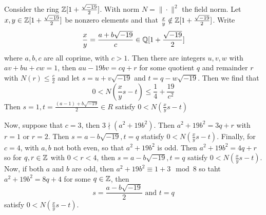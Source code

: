 \begin{example}\label{2.5}
    Consider the ring $\mathbb{Z}[1+\frac{\sqrt{-19}}{2}]$. With norm  $N=\|\cdot\|^2$
    the field norm. Let $x,y \in \mathbb{Z}[1+\frac{\sqrt{-19}}{2}]$ be nonzero elements
    and that $\frac{x}{y} \notin \mathbb{Z}[1+\frac{\sqrt{-19}}{2}]$. Write
    \begin{equation*}
        \frac{x}{y}=\frac{a+b\sqrt{-19}}{c} \in \mathbb{Q}[1+\frac{\sqrt{-19}}{2}]
    \end{equation*}
    where $a,b,c$ are all coprime, with  $c>1$. Then there are integers $u,v,w$
    with $av+bu+cw=1$, then  $au-19bv=cq+r$ for some quotient $q$ and remainder
    $r$ with  $N(r) \leq \frac{c}{2}$ and let $s=u+v\sqrt{-19}$ and
    $t=q-w\sqrt{-19}$. Then we find that
    \begin{equation*}
        0<N(\frac{x}{y}s-t) \leq \frac{1}{4}+\frac{19}{c^2}
    \end{equation*}
    Then $s=1, t=\frac{(a-1)+b\sqrt{-19}}{2} \in R$ satisfy $0<N(\frac{x}{y}s-t)$

    Now, suppose that $c=3$, then $3 \nmid (a^2+19b^2)$. Then $a^2+19b^2=3q+r$
    with  $r=1$ or $r=2$. Then $s=a-b\sqrt{-19},t=q$ statisfy
    $0<N(\frac{x}{y}s-t)$. Finally, for $c=4$, with $a,b$ not both even, so
    that $a^2+19b^2$ is odd. Then $a^2+19b^2=4q+r$ so for $q,r \in \mathbb{Z}$ with
    $0<r<4$, then $s=a-b\sqrt{-19}, t=q$ satisfy $0<N(\frac{x}{y}s-t)$. Now, if
    both $a$ and  $b$ are odd, then  $a^2+19b^2 \equiv 1+3 \mod{8}$ so taht
    $a^2+19b^2=8q+4$ for some  $q \in \mathbb{Z}$, then
    \begin{equation*}
        s=\frac{a-b\sqrt{-19}}{2} \text{ and } t=q
    \end{equation*}
    satisfy $0<N(\frac{x}{y}s-t)$.
\end{example}
